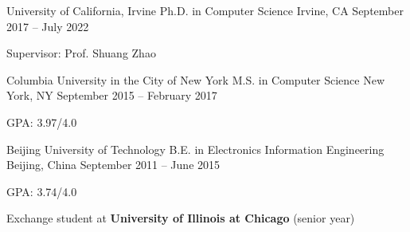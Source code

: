 
\begin{cventries}

  \cventry
    {University of California, Irvine}
    {Ph.D. in Computer Science}
    {Irvine, CA}
    {September 2017 -- July 2022}
    {
      \begin{cvitems}
        \item{Supervisor: Prof. Shuang Zhao}
      \end{cvitems}
    }

  \cventry
    {Columbia University in the City of New York}
    {M.S. in Computer Science}
    {New York, NY}
    {September 2015 -- February 2017}
    {     
    	\begin{cvitems}
    		\item{GPA: 3.97/4.0}
    	\end{cvitems}
	}

  \cventry
	{Beijing University of Technology}
	{B.E. in Electronics Information Engineering}
	{Beijing, China}
	{September 2011 -- June 2015}
	{   
		\begin{cvitems}
			\item{GPA: 3.74/4.0}
			\item{Exchange student at \textbf{University of Illinois at Chicago} (senior year)}
		\end{cvitems}
	}


\end{cventries}
